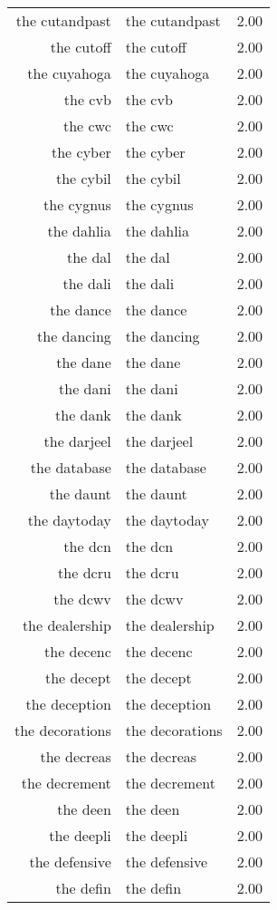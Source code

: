 \begin{table}[ht]
\begin{tabular}{rlr}
  the cutandpast & the cutandpast & 2.00 \\ 
  the cutoff & the cutoff & 2.00 \\ 
  the cuyahoga & the cuyahoga & 2.00 \\ 
  the cvb & the cvb & 2.00 \\ 
  the cwc & the cwc & 2.00 \\ 
  the cyber & the cyber & 2.00 \\ 
  the cybil & the cybil & 2.00 \\ 
  the cygnus & the cygnus & 2.00 \\ 
  the dahlia & the dahlia & 2.00 \\ 
  the dal & the dal & 2.00 \\ 
  the dali & the dali & 2.00 \\ 
  the dance & the dance & 2.00 \\ 
  the dancing & the dancing & 2.00 \\ 
  the dane & the dane & 2.00 \\ 
  the dani & the dani & 2.00 \\ 
  the dank & the dank & 2.00 \\ 
  the darjeel & the darjeel & 2.00 \\ 
  the database & the database & 2.00 \\ 
  the daunt & the daunt & 2.00 \\ 
  the daytoday & the daytoday & 2.00 \\ 
  the dcn & the dcn & 2.00 \\ 
  the dcru & the dcru & 2.00 \\ 
  the dcwv & the dcwv & 2.00 \\ 
  the dealership & the dealership & 2.00 \\ 
  the decenc & the decenc & 2.00 \\ 
  the decept & the decept & 2.00 \\ 
  the deception & the deception & 2.00 \\ 
  the decorations & the decorations & 2.00 \\ 
  the decreas & the decreas & 2.00 \\ 
  the decrement & the decrement & 2.00 \\ 
  the deen & the deen & 2.00 \\ 
  the deepli & the deepli & 2.00 \\ 
  the defensive & the defensive & 2.00 \\ 
  the defin & the defin & 2.00 \\ 

\end{tabular}
\end{table}
